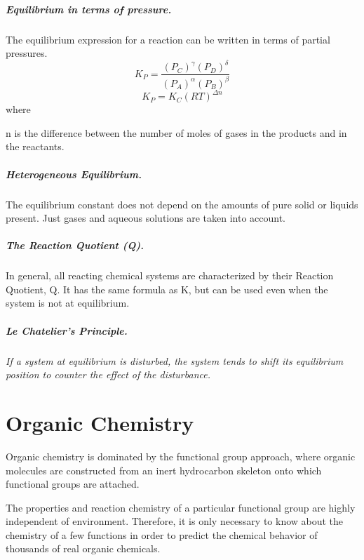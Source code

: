 \documentclass[oneside]{book} %
\theoremstyle{plain}
\begin{document}
\paragraph{Equilibrium in terms of pressure.} The equilibrium expression for a
reaction can be written in terms of partial pressures.
\[K_P = \frac{\left(P_C\right)^\gamma
\left(P_D\right)^\delta}{\left(P_A\right)^\alpha \left(P_B\right)^\beta}\]
\[K_P = K_C (RT)^{\Delta n}\]
where

n is the difference between the number of moles of gases in the products and in
the reactants.

\paragraph{Heterogeneous Equilibrium.} The equilibrium constant does not depend
on the amounts of pure solid
or liquids present. Just gases and aqueous solutions are taken into account.

\paragraph{The Reaction Quotient (Q).} In general, all reacting chemical
systems are characterized by their Reaction Quotient, Q. It has the same
formula as K, but can be used even when the system is not at equilibrium.

\paragraph{Le Chatelier's Principle.} \textit{If a system at equilibrium is
disturbed, the system tends to shift its equilibrium position to counter the
effect of the disturbance.}


\chapter{Organic Chemistry}
Organic chemistry is dominated by the functional group approach, where organic
molecules are constructed from an inert hydrocarbon skeleton onto which
functional groups are attached.

The properties and reaction chemistry of a particular functional group are
highly independent of environment. Therefore, it is only necessary to know about
the chemistry of a few functions in order to predict the chemical behavior of
thousands of real organic chemicals.
\end{document}
